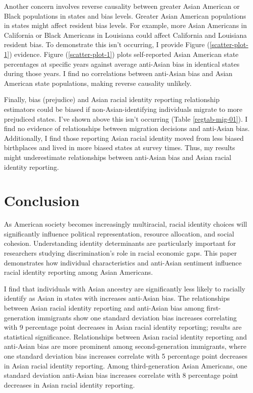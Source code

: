 Another concern involves reverse causality between greater Asian American or Black populations in states and bias levels. Greater Asian American populations in states might affect resident bias levels. For example, more Asian Americans in California or Black Americans in Louisiana could affect California and Louisiana resident bias. To demonstrate this isn't occurring, I provide Figure (\ref{scatter-plot-1}) evidence. Figure (\ref{scatter-plot-1}) plots self-reported Asian American state percentages at specific years against average anti-Asian bias in identical states during those years. I find no correlations between anti-Asian bias and Asian American state populations, making reverse causality unlikely.

Finally, bias (prejudice) and Asian racial identity reporting relationship estimators could be biased if non-Asian-identifying individuals migrate to more prejudiced states. I've shown above this isn't occurring (Table \ref{regtab-mig-01}). I find no evidence of relationships between migration decisions and anti-Asian bias. Additionally, I find those reporting Asian racial identity moved from less biased birthplaces and lived in more biased states at survey times. Thus, my results might underestimate relationships between anti-Asian bias and Asian racial identity reporting.

\section{Conclusion}\label{sec:conc}

As American society becomes increasingly multiracial, racial identity choices will significantly influence political representation, resource allocation, and social cohesion. Understanding identity determinants are particularly important for researchers studying discrimination's role in racial economic gaps. This paper demonstrates how individual characteristics and anti-Asian sentiment influence racial identity reporting among Asian Americans.

I find that individuals with Asian ancestry are significantly less likely to racially identify as Asian in states with increases anti-Asian bias. The relationships between Asian racial identity reporting and anti-Asian bias among first-generation immigrants show one standard deviation bias increases correlating with 9 percentage point decreases in Asian racial identity reporting; results are statistical significance. Relationships between Asian racial identity reporting and anti-Asian bias are more prominent among second-generation immigrants, where one standard deviation bias increases correlate with 5 percentage point decreases in Asian racial identity reporting. Among third-generation Asian Americans, one standard deviation anti-Asian bias increases correlate with 8 percentage point decreases in Asian racial identity reporting.

